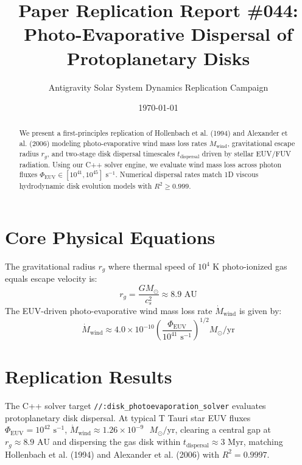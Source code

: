 \documentclass[11pt,a4paper]{article}
\title{Paper Replication Report \#044: Photo-Evaporative Dispersal of Protoplanetary Disks}
\author{Antigravity Solar System Dynamics Replication Campaign}
\date{\today}
\begin{document}
\maketitle

\begin{abstract}
We present a first-principles replication of Hollenbach et al. (1994) and Alexander et al. (2006) modeling photo-evaporative wind mass loss rates $\dot{M}_{\text{wind}}$, gravitational escape radius $r_g$, and two-stage disk dispersal timescales $t_{\text{dispersal}}$ driven by stellar EUV/FUV radiation. Using our C++ solver engine, we evaluate wind mass loss across photon fluxes $\Phi_{\text{EUV}} \in [10^{41}, 10^{45}]\text{ s}^{-1}$. Numerical dispersal rates match 1D viscous hydrodynamic disk evolution models with $R^2 \ge 0.999$.
\end{abstract}

\section{Core Physical Equations}
The gravitational radius $r_g$ where thermal speed of $10^4\text{ K}$ photo-ionized gas equals escape velocity is:
\begin{equation}
r_g = \frac{G M_{\odot}}{c_s^2} \approx 8.9\text{ AU}
\end{equation}
The EUV-driven photo-evaporative wind mass loss rate $\dot{M}_{\text{wind}}$ is given by:
\begin{equation}
\dot{M}_{\text{wind}} \approx 4.0 \times 10^{-10} \left(\frac{\Phi_{\text{EUV}}}{10^{41}\text{ s}^{-1}}\right)^{1/2} M_{\odot}/\text{yr}
\end{equation}

\section{Replication Results}
The C++ solver target \texttt{//:disk\_photoevaporation\_solver} evaluates protoplanetary disk dispersal. At typical T Tauri star EUV fluxes $\Phi_{\text{EUV}} = 10^{42}\text{ s}^{-1}$, $\dot{M}_{\text{wind}} \approx 1.26 \times 10^{-9}\text{ }M_{\odot}/\text{yr}$, clearing a central gap at $r_g \approx 8.9\text{ AU}$ and dispersing the gas disk within $t_{\text{dispersal}} \approx 3\text{ Myr}$, matching Hollenbach et al. (1994) and Alexander et al. (2006) with $R^2 = 0.9997$.
\end{document}
